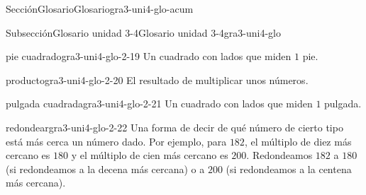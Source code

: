 \documentclass[twoside,10pt,]{article}
\begin{document}
\begin{sectionptx}{Sección}{Glosario}{}{Glosario}{}{}{gra3-uni4-glo-acum}
\begin{subsectionptx}{Subsección}{Glosario unidad 3-4}{}{Glosario unidad 3-4}{}{}{gra3-uni4-glo}
\begin{descriptionlist}
\begin{dlimedium}{pie cuadrado}{gra3-uni4-glo-2-19}
Un cuadrado con lados que miden \(1\) pie.%
\end{dlimedium}%
\begin{dlimedium}{producto}{gra3-uni4-glo-2-20}%
El resultado de multiplicar unos números.%
\end{dlimedium}%
\begin{dlimedium}{pulgada cuadrada}{gra3-uni4-glo-2-21}%
Un cuadrado con lados que miden \(1\) pulgada.%
\end{dlimedium}%
\begin{dlimedium}{redondear}{gra3-uni4-glo-2-22}%
Una forma de decir de qué número de cierto tipo está más cerca un número dado. Por ejemplo, para \(182\), el múltiplo de diez más cercano es \(180\) y el múltiplo de cien más cercano es \(200\). Redondeamos \(182\) a \(180\) (si redondeamos a la decena más cercana) o a \(200\) (si redondeamos a la centena más cercana).%
\end{dlimedium}%
\end{descriptionlist}
\end{subsectionptx}
\end{sectionptx}
%
%
\typeout{************************************************}
\typeout{************************************************}
%
\end{document}
